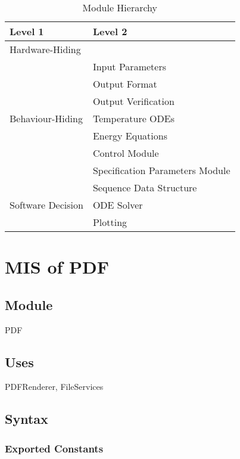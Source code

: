 \documentclass[12pt, titlepage]{article}
\begin{document}
	\begin{table}[h!]
		\centering
		\begin{tabular}{p{} p{}}
			\toprule
			\textbf{Level 1} & \textbf{Level 2}\\
			\midrule
			
			{Hardware-Hiding} & ~ \\
			\midrule
			
			\multirow{7}{0.3\textwidth}{Behaviour-Hiding} & Input Parameters\\
			& Output Format\\
			& Output Verification\\
			& Temperature ODEs\\
			& Energy Equations\\ 
			& Control Module\\
			& Specification Parameters Module\\
			\midrule
			
			\multirow{3}{0.3\textwidth}{Software Decision} & {Sequence Data Structure}\\
			& ODE Solver\\
			& Plotting\\
			\bottomrule
			
		\end{tabular}
		\caption{Module Hierarchy}
		\label{TblMH}
	\end{table}
	
	\newpage
	
	\section{MIS of PDF} \label{Module}
	
	\subsection{Module}
	
	PDF
	
	\subsection{Uses}
	
	PDFRenderer, FileServices
	
	\subsection{Syntax}
	
	\subsubsection{Exported Constants}
	
\end{document}
